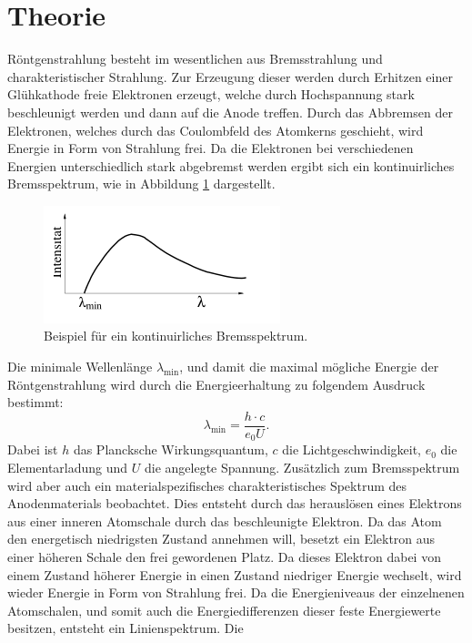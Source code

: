 \section{Theorie}
\label{sec:Theorie}
Röntgenstrahlung besteht im wesentlichen aus Bremsstrahlung und charakteristischer Strahlung. Zur Erzeugung dieser werden durch Erhitzen
einer Glühkathode freie Elektronen erzeugt, welche durch Hochspannung stark beschleunigt werden und dann auf die Anode treffen. Durch das Abbremsen der Elektronen,
welches durch das Coulombfeld des Atomkerns geschieht, wird Energie in Form von Strahlung frei. Da die Elektronen bei verschiedenen Energien unterschiedlich stark
abgebremst werden ergibt sich ein kontinuirliches Bremsspektrum, wie in Abbildung \ref{fig:kontinuirlich} dargestellt.
\begin{figure}
  \centering
  \includegraphics{images/kontinuirlich.png}
  \caption{Beispiel für ein kontinuirliches Bremsspektrum.\cite{sample}}
  \label{fig:kontinuirlich}
\end{figure}
Die minimale Wellenlänge ${\lambda}_\text{min}$, und damit die maximal mögliche Energie der Röntgenstrahlung wird durch die Energieerhaltung zu folgendem Ausdruck bestimmt:
\begin{equation}
  {\lambda}_\text{min} = \frac{h \cdot c}{e_0 U} .
  \label{eqn:lambdamin}
\end{equation}
Dabei ist $h$ das Plancksche Wirkungsquantum, $c$ die Lichtgeschwindigkeit, $e_0$ die Elementarladung und $U$ die angelegte Spannung.
Zusätzlich zum Bremsspektrum wird aber auch ein materialspezifisches charakteristisches Spektrum des Anodenmaterials beobachtet. Dies entsteht durch das herauslösen eines
Elektrons aus einer inneren Atomschale durch das beschleunigte Elektron. Da das Atom den energetisch niedrigsten Zustand annehmen will, besetzt ein Elektron aus einer höheren
Schale den frei gewordenen Platz. Da dieses Elektron dabei von einem Zustand höherer Energie in einen Zustand niedriger Energie wechselt, wird wieder Energie in Form von
Strahlung frei. Da die Energieniveaus der einzelnenen Atomschalen, und somit auch die Energiedifferenzen dieser feste Energiewerte besitzen, entsteht ein Linienspektrum. Die
